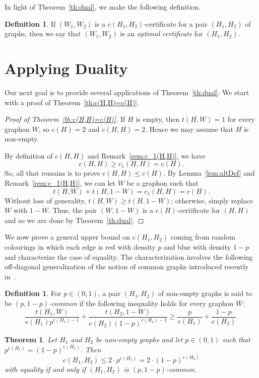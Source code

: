 \documentclass[12pt]{article}
\numberwithin{equation}{section}
\newtheorem{thm}[equation]{Theorem}
\theoremstyle{definition}
\newtheorem{defn}[equation]{Definition}
\theoremstyle{remark}
\begin{document}
In light of Theorem~\ref{th:dual}, we make the following definition. 


\begin{defn}
If $(W_1,W_2)$ is a $c(H_1,H_2)$-certificate for a pair $(H_1,H_2)$ of graphs, then we say that $(W_1,W_2)$ is an \emph{optimal certificate} for $(H_1,H_2)$.
\end{defn}


\section{Applying Duality}
\label{sec:applications}


Our next goal is to provide several applications of Theorem~\ref{th:dual}. We start with a proof of Theorem~\ref{th:c(H,H)=c(H)}.

\begin{proof}[Proof of Theorem~\ref{th:c(H,H)=c(H)}]
If $H$ is empty, then $t(H,W)=1$ for every graphon $W$, so $c(H)=2$ and $c(H,H)=2$. Hence we may assume that $H$ is non-empty.

By definition of $c(H,H)$ and Remark~\ref{rem:c_1(H,H)}, we have
\[c(H,H)\geq c_1(H,H)=c(H).\]
So, all that remains is to prove $c(H,H)\leq c(H)$. By Lemma~\ref{lem:altDef} and Remark~\ref{rem:c_1(H,H)}, we can let $W$ be a graphon such that
\[t(H,W) + t(H,1-W) = c_1(H,H)=c(H).\]
Without loss of generality, $t(H,W)\geq t(H,1-W)$; otherwise, simply replace $W$ with $1-W$. Thus, the pair $(W,1-W)$ is a $c(H)$-certificate for $(H,H)$ and so we are done by Theorem~\ref{th:dual}. 
\end{proof}

We now prove a general upper bound on $c(H_1,H_2)$ coming from random colourings in which each edge is red with density $p$ and blue with density $1-p$ and characterize the case of equality. The characterization involves the following off-diagonal generalization of the notion of common graphs introduced recently in~\cite{BehagueMorrisonNoel25}.

\begin{defn}
For $p\in (0,1)$, a pair $(H_1,H_2)$ of non-empty graphs is said to be \emph{$(p,1-p)$-common} if the following inequality holds for every graphon $W$:
\[\frac{t(H_1,W)}{e(H_1) p^{e(H_1)-1}} + \frac{t(H_2,1-W)}{e(H_2) (1-p)^{e(H_2)-1}}\geq \frac{p}{e(H_1)}+\frac{1-p}{e(H_2)}.\]
\end{defn}



\begin{thm}
\label{th:commonPair}
Let $H_1$ and $H_2$ be non-empty graphs and let $p\in(0,1)$ such that $p^{e(H_1)}=(1-p)^{e(H_2)}$. Then
\[c(H_1,H_2)\leq 2\cdot p^{e(H_1)}=2\cdot(1-p)^{e(H_2)}\]
with equality if and only if $(H_1,H_2)$ is $(p,1-p)$-common. 
\end{thm}
\end{document}

